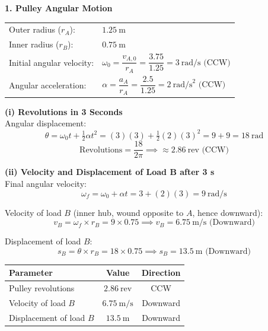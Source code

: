 \documentclass[12pt,a3paper]{article}
\begin{document}
\begin{enumerate}
\begin{tcolorbox}[enhanced,breakable,ansbox,colback=cH!4,colframe=cH,
  boxrule=0.8pt,arc=5pt,
  title={\textbf{Solution}},fonttitle=\bfseries\color{white},
  colbacktitle=cH]

\textbf{1. Pulley Angular Motion}\\[4pt]
\begin{center}
\begin{tabular}{ll}
  Outer radius ($r_A$):             & $1.25\ \text{m}$ \\[3pt]
  Inner radius ($r_B$):             & $0.75\ \text{m}$ \\[3pt]
  Initial angular velocity:         & $\omega_0 = \dfrac{v_{A,0}}{r_A} = \dfrac{3.75}{1.25} = 3\ \text{rad/s (CCW)}$ \\[6pt]
  Angular acceleration:             & $\alpha = \dfrac{a_A}{r_A} = \dfrac{2.5}{1.25} = 2\ \text{rad/s}^2 \text{ (CCW)}$
\end{tabular}
\end{center}

\medskip
\textbf{(i) Revolutions in 3 Seconds}\\[4pt]

Angular displacement:
\[
  \theta = \omega_0 t + \tfrac{1}{2}\alpha t^2
         = (3)(3) + \tfrac{1}{2}(2)(3)^2
         = 9 + 9 = 18\ \text{rad}
\]
\[
  \text{Revolutions} = \frac{18}{2\pi}
  \implies \boxed{\approx 2.86\ \text{rev (CCW)}}
\]

\medskip
\textbf{(ii) Velocity and Displacement of Load B after 3 s}\\[4pt]

Final angular velocity:
\[
  \omega_f = \omega_0 + \alpha t = 3 + (2)(3) = 9\ \text{rad/s}
\]

Velocity of load $B$ (inner hub, wound opposite to $A$, hence downward):
\[
  v_B = \omega_f \times r_B = 9 \times 0.75
  \implies \boxed{v_B = 6.75\ \text{m/s (Downward)}}
\]

Displacement of load $B$:
\[
  s_B = \theta \times r_B = 18 \times 0.75
  \implies \boxed{s_B = 13.5\ \text{m (Downward)}}
\]

\medskip
\begin{center}
\renewcommand{\arraystretch}{1.4}
\begin{tabular}{lcc}
  \hline
  \textbf{Parameter} & \textbf{Value} & \textbf{Direction} \\
  \hline
  Pulley revolutions  & $2.86\ \text{rev}$  & CCW \\
  Velocity of load $B$ & $6.75\ \text{m/s}$ & Downward \\
  Displacement of load $B$ & $13.5\ \text{m}$ & Downward \\
  \hline
\end{tabular}
\end{center}


\end{tcolorbox}
\end{enumerate}
\end{document}
